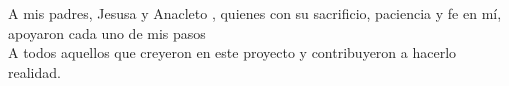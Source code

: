 \cleardoublepage
\thispagestyle{empty} %

\vspace*{0.3\textheight} %

\begin{flushright}
    \begin{minipage}{0.5\textwidth}
        \itshape \raggedleft
        
        A mis padres, Jesusa y Anacleto , quienes con su sacrificio, paciencia
        y fe en mí, apoyaron cada uno de mis pasos\\
        \vspace{0.3cm}
        A todos aquellos que creyeron en este proyecto y contribuyeron a hacerlo realidad.
        
    \end{minipage}
\end{flushright}

\vfill